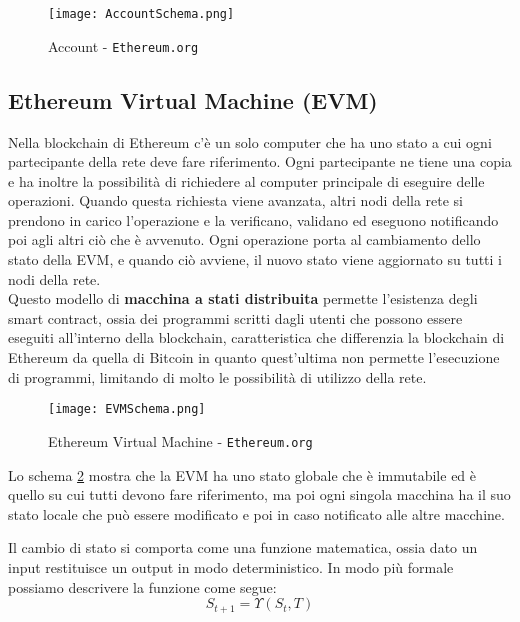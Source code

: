 \begin{figure}[H]
    \centering
    \texttt{[image: AccountSchema.png]} 
    \caption{Account - \texttt{Ethereum.org}\cite{accountSchema}}
    \label{fig:Account}
\end{figure}

\subsection{Ethereum Virtual Machine (EVM)}
Nella blockchain di Ethereum c'è un solo computer che ha uno stato a cui
ogni partecipante della rete deve fare riferimento. Ogni partecipante ne tiene
una copia e ha inoltre la possibilità di richiedere al computer principale di
eseguire delle operazioni. Quando questa richiesta viene avanzata, altri
nodi della rete si prendono in carico l'operazione e la verificano, validano ed
eseguono notificando poi agli altri ciò che è avvenuto.
Ogni operazione porta al cambiamento dello stato della EVM, e quando ciò
avviene, il nuovo stato viene aggiornato su tutti i nodi della rete. \\
Questo modello di \textbf{macchina a stati distribuita} permette l'esistenza
degli smart contract, ossia dei programmi scritti dagli utenti che possono
essere eseguiti all'interno della blockchain, caratteristica che differenzia
la blockchain di Ethereum da quella di Bitcoin in quanto quest'ultima non
permette l'esecuzione di programmi, limitando di molto le possibilità di
utilizzo della rete.

\begin{figure}[H]
    \centering
    \texttt{[image: EVMSchema.png]} 
    \caption{Ethereum Virtual Machine - \texttt{Ethereum.org}\cite{EVMSchema}}
    \label{fig:EVM}
\end{figure}

Lo schema \ref{fig:EVM} mostra che la EVM ha uno stato globale che è immutabile
ed è quello su cui tutti devono fare riferimento, ma poi ogni singola macchina
ha il suo stato locale che può essere modificato e poi in caso notificato alle
altre macchine.

Il cambio di stato si comporta come una funzione matematica, ossia dato un
input restituisce un output in modo deterministico. In modo più formale 
possiamo descrivere la funzione come segue:
\begin{equation}
    \label{eq:stateChange}
    S_{t+1} = \Upsilon(S_t, T)
\end{equation}

